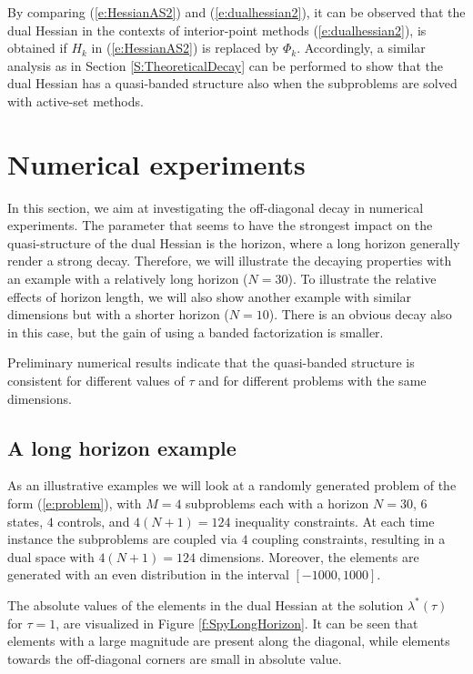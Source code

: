 By comparing (\ref{e:HessianAS2}) and (\ref{e:dualhessian2}), it can be observed that the dual Hessian in the contexts of interior-point methods (\ref{e:dualhessian2}), is obtained if $H_k$ in (\ref{e:HessianAS2}) is replaced by $\Phi_k$. Accordingly, a similar analysis as in Section \ref{S:TheoreticalDecay} can be performed to show that the dual Hessian has a quasi-banded structure also when the subproblems are solved with active-set methods.

\section{Numerical experiments} \label{S:NumericalExperiments}

In this section, we aim at investigating the off-diagonal decay in numerical experiments. The parameter that seems to have the strongest impact on the quasi-structure of the dual Hessian is the horizon, where a long horizon generally render a strong decay. Therefore, we will illustrate the decaying properties with an example with a relatively long horizon ($N=30$). To illustrate the relative effects of horizon length, we will also show another example with similar dimensions but with a shorter horizon ($N=10$). There is an obvious decay also in this case, but the gain of using a banded factorization is smaller.

Preliminary numerical results indicate that the quasi-banded structure is consistent for different values of $\tau$ and for different problems with the same dimensions. 

\subsection{A long horizon example}
As an illustrative examples we will look at a randomly generated problem of the form (\ref{e:problem}), with $M=4$ subproblems each with a horizon $N=30$, $6$ states, $4$ controls, and $4(N+1) = 124$ inequality constraints. At each time instance the subproblems are coupled via $4$ coupling constraints, resulting in a dual space with $4(N+1) = 124$ dimensions. Moreover, the elements are generated with an even distribution in the interval $[-1000, 1000]$.

The absolute values of the elements in the dual Hessian at the solution $\lambda^*(\tau)$ for $\tau=1$, are visualized in Figure \ref{f:SpyLongHorizon}. It can be seen that elements with a large magnitude are present along the diagonal, while elements towards the off-diagonal corners are small in absolute value.

